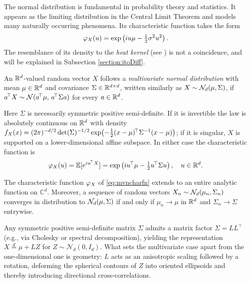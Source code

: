 The normal distribution is fundamental in probability theory and statistics. It appears as the limiting distribution in the Central Limit Theorem and models many naturally occurring phenomena. Its characteristic function takes the form
\begin{equation}
\varphi_X(u) = \exp\left( i u \mu - \tfrac{1}{2} \sigma^2 u^2 \right).
\end{equation}
The resemblance of its density to the \textit{heat kernel} (see \cite{evans2010}) is not a coincidence, and will be explained in Subsection \ref{section:itoDiff}.

\begin{example}\label{example:multivariatenormal}
An $\mathbb{R}^d$-valued random vector $X$ follows a \textit{multivariate normal distribution} with
mean $\mu \in \mathbb{R}^d$ and covariance $\Sigma \in \mathbb{R}^{d\times d}$, written similarly as
$X \sim \mathcal{N}_d(\mu,\Sigma)$, if $a^{\!\top} X \sim \mathcal{N}(a^{\!\top}\mu,\, a^{\!\top}\Sigma a)$ for
every $a \in \mathbb{R}^d$.
\end{example}

Here $\Sigma$ is necessarily symmetric positive semi-definite. If it is invertible the law is
absolutely continuous on $\mathbb{R}^d$ with density
$f_X(x) = (2\pi)^{-d/2}\det(\Sigma)^{-1/2}\exp\bigl(-\tfrac12 (x-\mu)^{\!\top}\Sigma^{-1}(x-\mu)\bigr)$;
if it is singular, $X$ is supported on a lower-dimensional affine subspace. In either case the
characteristic function is
\begin{equation}\label{eq:mvncharfn}
\varphi_X(u) = \mathbb{E}[e^{i u^{\!\top} X}] = \exp\left( i u^{\!\top} \mu - \tfrac{1}{2} u^{\!\top} \Sigma u \right), \quad u \in \mathbb{R}^d.
\end{equation}

The characteristic function $\varphi_X$ of \eqref{eq:mvncharfn} extends to an entire analytic function on $\mathbb{C}^d$. Moreover, a sequence of random vectors $X_n \sim \mathcal{N}_d(\mu_n, \Sigma_n)$ converges in distribution to $\mathcal{N}_d(\mu, \Sigma)$ if and only if $\mu_n \to \mu$ in $\mathbb{R}^d$ and $\Sigma_n \to \Sigma$ entrywise.

Any symmetric positive semi-definite matrix $\Sigma$ admits a matrix factor $\Sigma = L L^{\top}$ (e.g., via Cholesky or spectral decomposition), yielding the representation $X \stackrel{d}{=} \mu + L Z$ for $Z \sim \mathcal{N}_d(0, I_d)$. What sets the multivariate case apart from the one-dimensional one is geometry: $L$ acts as an anisotropic scaling followed by a rotation, deforming the spherical contours of $Z$ into oriented ellipsoids and thereby introducing directional cross-correlations.

